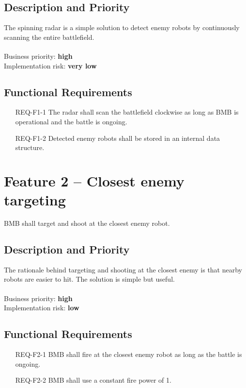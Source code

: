 \documentclass{scrreprt}
\begin{document}
\subsection{Description and Priority}
The spinning radar is a simple solution to detect enemy robots by continuously scanning the entire battlefield.\\\\Business priority: \textbf{high}\\
Implementation risk: \textbf{very low}

\subsection{Functional Requirements}
\begin{itemize}
\item[REQ-F1-1] The radar shall scan the battlefield clockwise as long as BMB is operational and the battle is ongoing.
\item[REQ-F1-2] Detected enemy robots shall be stored in an internal data structure. 
\end{itemize}

\section{Feature 2 -- Closest enemy targeting}
BMB shall target and shoot at the closest enemy robot.

\subsection{Description and Priority}
The rationale behind targeting and shooting at the closest enemy is that nearby robots are easier to hit. The solution is simple but useful.\\\\Business priority: \textbf{high}\\
Implementation risk: \textbf{low}

\subsection{Functional Requirements}
\begin{itemize}
\item[REQ-F2-1] BMB shall fire at the closest enemy robot as long as the battle is ongoing.
\item[REQ-F2-2] BMB shall use a constant fire power of 1.
\end{itemize}
\end{document}
